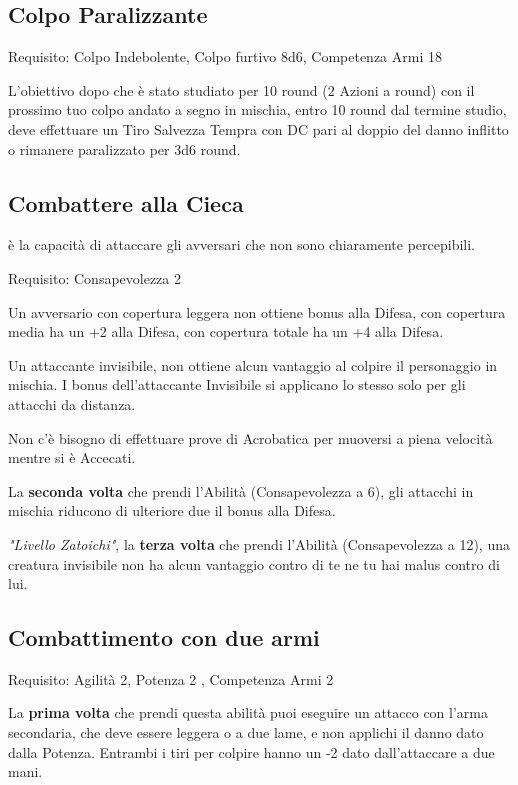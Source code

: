 \documentclass[a4paper,11pt,twoside,openany]{book}
\begin{document}
\subsection{Colpo Paralizzante}

Requisito: Colpo Indebolente, Colpo furtivo 8d6, Competenza Armi 18

L'obiettivo dopo che è stato studiato per 10 round (2 Azioni a round) con il prossimo tuo colpo andato a segno in mischia, entro 10 round dal termine studio, deve effettuare un Tiro Salvezza Tempra con DC pari al doppio del danno inflitto o rimanere paralizzato per 3d6 round.

\subsection{Combattere alla Cieca}

è la capacità di attaccare gli avversari che non sono chiaramente percepibili.

Requisito: Consapevolezza 2

Un avversario con copertura leggera non ottiene bonus alla Difesa, con copertura media ha un +2 alla Difesa, con copertura totale ha un +4 alla Difesa.

Un attaccante invisibile, non ottiene alcun vantaggio al colpire il personaggio in mischia. I bonus dell'attaccante Invisibile si applicano lo stesso solo per gli attacchi da distanza.

Non c'è bisogno di effettuare prove di Acrobatica per muoversi a piena velocità mentre si è Accecati.

La \textbf{seconda volta} che prendi l'Abilità (Consapevolezza a 6), gli attacchi in mischia riducono di ulteriore due il bonus alla Difesa.

\textit{"Livello Zatoichi"}, la \textbf{terza volta} che prendi l'Abilità (Consapevolezza a 12), una creatura invisibile non ha alcun vantaggio contro di te ne tu hai malus contro di lui.

\subsection{Combattimento con due armi}

Requisito: Agilità 2, Potenza 2 , Competenza Armi 2

La \textbf{prima volta} che prendi questa abilità puoi eseguire un attacco con l'arma secondaria, che deve essere leggera o a due lame, e non applichi il danno dato dalla Potenza. Entrambi i tiri per colpire hanno un -2 dato dall'attaccare a due mani.
\end{document}
